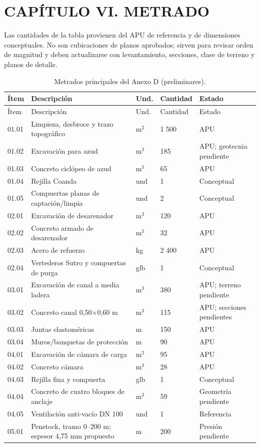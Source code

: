 \documentclass[11pt,a4paper]{article}
\newcommand{\capitulo}[2]{\clearpage\section*{CAPÍTULO #1. #2}\addcontentsline{toc}{section}{Capítulo #1. #2}}
\begin{document}
\capitulo{VI}{METRADO}
Las cantidades de la tabla provienen del APU de referencia y de dimensiones conceptuales. No son cubicaciones de planos aprobados; sirven para revisar orden de magnitud y deben actualizarse con levantamiento, secciones, clase de terreno y planos de detalle.
\begin{longtable}{p{1.25cm}p{6.9cm}p{1.0cm}p{1.25cm}p{2.2cm}}
\caption{Metrados principales del Anexo D (preliminares).}\\
\toprule Ítem & Descripción & Und. & Cantidad & Estado\\\midrule\endfirsthead
\toprule Ítem & Descripción & Und. & Cantidad & Estado\\\midrule\endhead
01.01 & Limpieza, desbroce y trazo topográfico & m$^2$ & 1 500 & APU\\
01.02 & Excavación para azud & m$^3$ & 185 & APU; geotecnia pendiente\\
01.03 & Concreto ciclópeo de azud & m$^3$ & 65 & APU\\
01.04 & Rejilla Coanda & und & 1 & Conceptual\\
01.05 & Compuertas planas de captación/limpia & und & 2 & Conceptual\\
02.01 & Excavación de desarenador & m$^3$ & 120 & APU\\
02.02 & Concreto armado de desarenador & m$^3$ & 32 & APU\\
02.03 & Acero de refuerzo & kg & 2 400 & APU\\
02.04 & Vertederos Sutro y compuertas de purga & glb & 1 & Conceptual\\
03.01 & Excavación de canal a media ladera & m$^3$ & 380 & APU; terreno pendiente\\
03.02 & Concreto canal 0,50×0,60 m & m$^3$ & 115 & APU; secciones pendientes\\
03.03 & Juntas elastoméricas & m & 150 & APU\\
03.04 & Muros/banquetas de protección & m & 90 & APU\\
04.01 & Excavación de cámara de carga & m$^3$ & 95 & APU\\
04.02 & Concreto cámara & m$^3$ & 28 & APU\\
04.03 & Rejilla fina y compuerta & glb & 1 & Conceptual\\
04.04 & Concreto de cuatro bloques de anclaje & m$^3$ & 59 & Geometría pendiente\\
04.05 & Ventilación anti-vacío DN 100 & und & 1 & Referencia\\
05.01 & Penstock, tramo 0--200 m; espesor 4,75 mm propuesto & m & 200 & Presión pendiente\\

\end{longtable}
\end{document}
